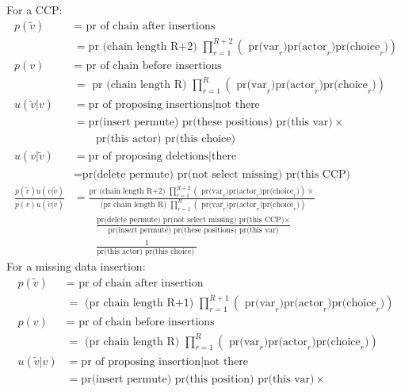 \documentclass[12pt,a4paper]{article}
\renewcommand{\=}{\,=\,}
\newcommand{\+}{\,+\,}
\newcommand{\sfn}[1]{\textbf{\texttt{#1}}}
\begin{document}
\begin{enumerate}
\sfn{ }\\
For a CCP:
\begin{align*}
p(\tilde{v})&=\text{ pr of chain after insertions}\\
& = \text{pr (chain length R+2) }
 \prod_{r=1}^{R+2} \left( \text{ pr(var}_r )
\text{pr(actor}_r)\text{pr(choice}_r) \right)\\
p(v)&=\text{ pr of chain before insertions}\\
& = \text{ pr (chain length R) }
 \prod_{r=1}^{R} \left( \text{ pr(var}_r )
\text{pr(actor}_r)\text{pr(choice}_r) \right)\\
u(\tilde{v}|v) &= \text{pr of proposing insertions} | \text{not
  there}\\
&=\text{pr(insert permute) pr(these positions) pr(this var)} \times \\
& \qquad  \text{pr(this actor) pr(this choice)}\\
 u(v|\tilde{v}) &= \text{pr of proposing deletions} | \text{there} \\
&=\text{pr(delete permute) pr(not select missing) pr(this CCP)}\\
\frac{p(\tilde{v}) u(v|\tilde{v})}
 {p(v) u(\tilde{v}|v)}&=\frac{\text{pr (chain length R+2) }
 \prod_{r=1}^{R+2} \left( \text{ pr(var}_r )
\text{pr(actor}_r)\text{pr(choice}_r)\right) \times}{\text{ (pr chain length R) }
 \prod_{r=1}^{R} \left( \text{ pr(var}_r )
\text{pr(actor}_r)\text{pr(choice}_r) \right)}\\
&\qquad \frac{\text{pr(delete permute) pr(not select missing) pr(this CCP)}
\times }
{\text{pr(insert permute) pr(these positions) pr(this var)} } \\
& \qquad \frac{1}{\text{pr(this actor) pr(this choice) }}
\end{align*}
For a missing data insertion:
\begin{align*}
p(\tilde{v})&=\text{ pr of chain after insertion}\\
& = \text{ (pr chain length R+1) }
 \prod_{r=1}^{R+1} \left( \text{ pr(var}_r )
\text{pr(actor}_r)\text{pr(choice}_r) \right)\\
p(v)&=\text{ pr of chain before insertions}\\
& = \text{ (pr chain length R) }
 \prod_{r=1}^{R} \left( \text{ pr(var}_r )
\text{pr(actor}_r)\text{pr(choice}_r) \right)\\
u(\tilde{v}|v) &= \text{pr of proposing insertion} | \text{not
  there}\\
&=\text{pr(insert permute) pr(this position) pr(this var)} \times \\

\end{align*}
\end{enumerate}
\end{document}
